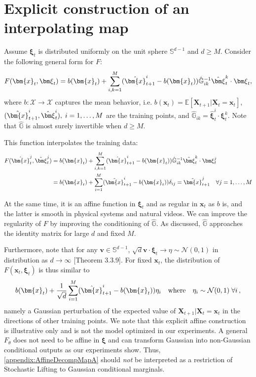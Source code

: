 \documentclass{article}
\theoremstyle{plain}
\theoremstyle{definition}
\theoremstyle{remark}
\newcommand{\bfxi}{{\bm \xi}}
\newcommand{\x}{\bm{x}}
\newcommand{\X}{\bm{X}}
\begin{document}
\section{Explicit construction of an interpolating map}

Assume $\bfxi_t$ is distributed uniformly on the unit sphere $\mathbb S^{d-1}$ and $d \geq M$. Consider the following general form for $F$:
\begin{align}
  F(\x_t, \bfxi_t) = b(\x_t) + \sum_{i, k = 1}^{M} (\hat \x_{t+1}^i - b(\x_t)) \hat{\mathbb G}_{ik}^{-1} \hat \bfxi_t^k \cdot \bfxi_t,
\end{align}
where $b: \mathcal X \to \mathcal X$ captures the mean behavior, i.e. $b(\x_t) = \mathbb E \left [\X_{t+1} | \X_t = \x_t \right ]$, $(\hat \x_{t+1}^i, \hat \bfxi_t^i), \; i = 1, \dots, M$ are the training points, and $\hat{\mathbb G}_{ik} = \hat \bfxi_t^i \cdot \bfxi^k_t$. Note that $\hat {\mathbb G}$ is almost surely invertible when $d \geq M$.

This function interpolates the training data:
\begin{align}
  F(\hat \x_t^j, \hat \bfxi_t^j) & = b(\x_t) + \sum_{i, k = 1}^{M} (\hat \x_{t+1}^i - b(\x_t)) \hat{\mathbb G}_{ik}^{-1} \hat \bfxi_t^k \cdot \bfxi_t^j \\
                                 & = b(\x_t) + \sum_{i = 1}^{M} (\hat \x_{t+1}^i - b(\x_t)) \delta_{ij} = \hat \x_{t+1}^j \quad \forall j = 1, \dots, M
\end{align}

At the same time, it is an affine function in $\bfxi_t$ and as regular in $\x_t$ as $b$ is, and the latter is smooth in physical systems and natural videos. We can improve the regularity of $F$ by improving the conditioning of $\hat{\mathbb G}$. As discussed, $\hat{\mathbb G}$ approaches the identity matrix for large $d$ and fixed $M$.

Furthermore, note that for any $\mathbf{v} \in \mathbb S^{d-1}$, $\sqrt{d} \mathbf{v} \cdot \bfxi_t \to \eta \sim \mathcal N(0, 1)$ in distribution as $d \to \infty$ \cite{Vershynin2018}[Theorem 3.3.9]. For fixed $\x_t$, the distribution of $F(\x_t, \bfxi_t)$ is thus similar to
\begin{align}\label{appendix:AffineDecompMapA}
  b(\x_t) + \frac{1}{\sqrt d} \sum_{i = 1}^{M} (\hat \x_{t+1}^i - b(\x_t)) \eta_i \quad \text{where} \quad \eta_i \sim \mathcal N(0, 1) \; \forall i \, ,
\end{align}
namely a Gaussian perturbation of the expected value of $\X_{t+1} | \X_t = \x_t$ in the directions of other training points. We note that this explicit affine construction is illustrative only and is not the model optimized in our experiments. A general $F_{\theta}$ does not need to be affine in $\bfxi$ and can transform Gaussian into non-Gaussian conditional outputs as our experiments show. Thus, \eqref{appendix:AffineDecompMapA} should \emph{not} be interpreted as a restriction of Stochastic Lifting to Gaussian conditional marginals.
\end{document}
